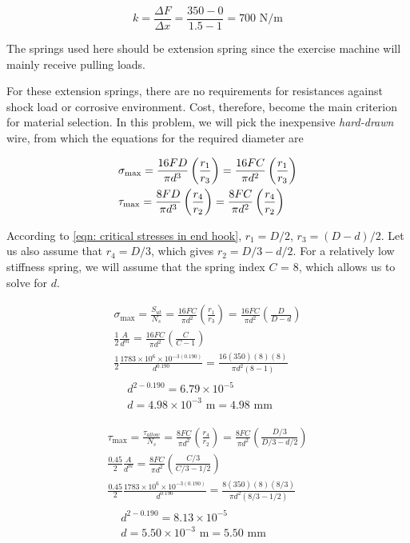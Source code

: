 \documentclass[a4paper,openany,nobib]{tufte-book}
\begin{document}
{{\begin{enumerate}
$$k = \frac{\Delta F}{\Delta x} = \frac{350 - 0}{1.5 - 1} = 700\text{ N/m}$$

The springs used here should be extension spring since the exercise
machine will mainly receive pulling loads.

For these extension springs, there are no requirements for resistances
against shock load or corrosive environment. Cost, therefore, become the
main criterion for material selection. In this problem, we will pick the
inexpensive \emph{hard-drawn} wire, from which the equations for the required
diameter are

$$\begin{gathered}
  \sigma_{\max} = \frac{16FD}{\pi d^3}\left( \frac{r_1}{r_3} \right) = \frac{16FC}{\pi d^2}\left( \frac{r_1}{r_3} \right) \hfill \\
  \tau_{\max} = \frac{8FD}{\pi d^3}\left( \frac{r_4}{r_2} \right) = \frac{8FC}{\pi d^2}\left( \frac{r_4}{r_2} \right) \hfill \\ 
\end{gathered}$$

According to
\ref{eqn: critical stresses in end hook},
\(r_1 = D / 2\), \(r_3 = (D - d) / 2\). Let us also assume that
\(r_4 = D / 3\), which gives \(r_2 = D / 3 - d / 2\). For a relatively low
stiffness spring, we will assume that the spring index \(C\) = 8, which
allows us to solve for \(d\).

$$\begin{gathered}
  \sigma_{\max} = \frac{S_{ut}}{N_s} = \frac{16FC}{\pi d^2}\left( \frac{r_1}{r_3} \right) = \frac{16FC}{\pi d^2}\left( \frac{D}{D - d} \right) \\
  \frac{1}{2}\frac{A}{d^m} = \frac{16FC}{\pi d^2}\left( \frac{C}{C - 1} \right) \\ 
  \frac{1}{2}\frac{1783 \times 10^6 \times 10^{-3(0.190)}}{d^{0.190}} = \frac{16(350)(8)(8)}{\pi d^2(8 - 1)} \\
  \begin{aligned}
  &d^{2-0.190} = 6.79 \times 10^{-5} \\ 
  &d = 4.98 \times 10^{-3} \text{ m} = 4.98\text{ mm}
  \end{aligned}\end{gathered}$$

$$\begin{gathered}
  \tau_{\max} = \frac{\tau_{allow}}{N_s} = \frac{8FC}{\pi d^2}\left( \frac{r_4}{r_2} \right) = \frac{8FC}{\pi d^2}\left( \frac{D/3}{D/3 - d/2} \right) \\ 
  \frac{0.45}{2}\frac{A}{d^m} = \frac{8FC}{\pi d^2}\left( \frac{C/3}{C/3 - 1/2} \right) \\ 
  \frac{0.45}{2}\frac{1783 \times 10^6 \times 10^{-3(0.190)}}{d^{0.190}} = \frac{8(350)(8)(8/3)}{\pi d^2(8/3 - 1/2)} \\
  \begin{aligned}
  &d^{2-0.190} = 8.13 \times 10^{-5} \\ 
  &d = 5.50 \times 10^{-3}\text{ m} = 5.50 \text{ mm}
  \end{aligned}\end{gathered}$$


\end{enumerate}}}
\end{document}
